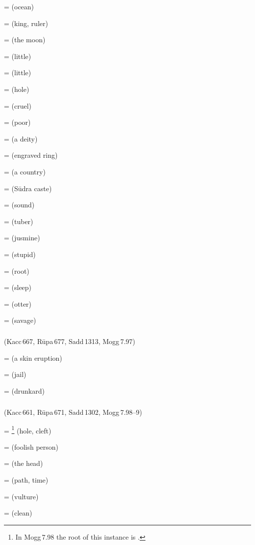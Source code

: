  =  (ocean)\par
{} =  (king, ruler)\par
{} =  (the moon)\par
{} =  (little)\par
{} =  (little)\par
{} =  (hole)\par
{} =  (cruel)\par
{} =  (poor)\par
{} =  (a deity)\par
{} =  (engraved ring)\par
{} =  (a country)\par
{} =  (S\=udra caste)\par
{} =  (sound)\par
{} =  (tuber)\par
{} =  (jusmine)\par
{} =  (stupid)\par
{} =  (root)\par
{} =  (sleep)\par
{} =  (otter)\par
{} =  (savage)\par

\subparagraph*{} (Kacc\,667, R\=upa\,677, Sadd\,1313, Mogg\,7.97)\label{pacckx:du}

 =  (a skin eruption)\par
{} =  (jail)\par
{} =  (drunkard)\par

\subparagraph*{} (Kacc\,661, R\=upa\,671, Sadd\,1302, Mogg\,7.98--9)\label{pacckx:dha2}

 = \footnote{In Mogg\,7.98 the root of this instance is .} (hole, cleft)\par
{} =  (foolish person)\par
{} =  (the head)\par
{} =  (path, time)\par
{} =  (vulture)\par
{} =  (clean)\par

